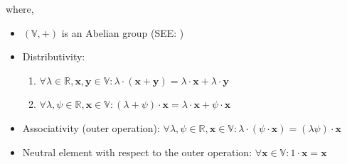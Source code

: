 where,
\begin{itemize}
    \item $(\mathbb{V}, +)$ is an Abelian group (SEE: )
    \item Distributivity:
    \begin{enumerate}
        \item $\forall \lambda \in \mathbb{R}, \mathbf{x,y}\in \mathbb{V} : \lambda\cdot(\mathbf{x+y}) = \lambda\cdot\mathbf{x} + \lambda\cdot\mathbf{y}$
        
        \item $\forall \lambda,\psi \in \mathbb{R}, \textbf{x}\in \mathbb{V} : (\lambda + \psi) \cdot\textbf{x} = \lambda\cdot\textbf{x} + \psi\cdot\textbf{x}$
        
    \end{enumerate}

    \item Associativity (outer operation): $\forall \lambda,\psi\in\mathbb{R}, \mathbf{x}\in\mathbb{V}: \lambda\cdot(\psi\cdot\mathbf{x}) = (\lambda\psi)\cdot\mathbf{x}$

    \item Neutral element with respect to the outer operation: $\forall \mathbf{x}\in\mathbb{V}:1\cdot\mathbf{x}=\mathbf{x}$
\end{itemize}
\vspace{0.3cm}

